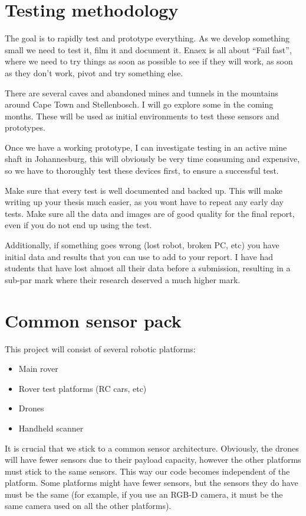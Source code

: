 \section{Testing methodology}
	The goal is to rapidly test and prototype everything. As we develop something small we need to test it, film it and document it. Enaex is all about ``Fail fast'', where we need to try things as soon as possible to see if they will work, as soon as they don't work, pivot and try something else.
	
	There are several caves and abandoned mines and tunnels in the mountains around Cape Town and Stellenbosch. I will go explore some in the coming months. These will be used as initial environments to test these sensors and prototypes. 
	
	Once we have a working prototype, I can investigate testing in an active mine shaft in Johannesburg, this will obviously be very time consuming and expensive, so we have to thoroughly test these devices first, to ensure a successful test.  

	Make sure that every test is well documented and backed up. This will make writing up your thesis much easier, as you wont have to repeat any early day tests. Make sure all the data and images are of good quality for the final report, even if you do not end up using the test. 
	
	Additionally, if something goes wrong (lost robot, broken PC, etc) you have initial data and results that you can use to add to your report. I have had students that have lost almost all their data before a submission, resulting in a sub-par mark where their research deserved a much higher mark. 
\section{Common sensor pack}
	This project will consist of several robotic platforms:
	
	\begin{itemize}
		\item Main rover
		\item Rover test platforms (RC cars, etc)
		\item Drones
		\item Handheld scanner
	\end{itemize}
	
	It is crucial that we stick to a common sensor architecture. Obviously, the drones will have fewer sensors due to their payload capacity, however the other platforms must stick to the same sensors. This way our code becomes independent of the platform. Some platforms might have fewer sensors, but the sensors they do have must be the same (for example, if you use an RGB-D camera, it must be the same camera used on all the other platforms).
	
